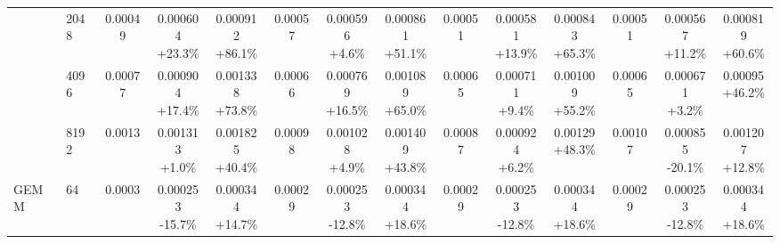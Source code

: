 \documentclass[acmlarge]{acmart}
\begin{document}
\begin{table}[htbp]
\begin{tabular}{llcccccccccccc}
 & 2048 & 0.00049 & \makecell{0.000604\\{\scriptsize +23.3\%}} & \makecell{0.000912\\{\scriptsize +86.1\%}} & 0.00057 & \makecell{0.000596\\{\scriptsize +4.6\%}} & \makecell{0.000861\\{\scriptsize +51.1\%}} & 0.00051 & \makecell{0.000581\\{\scriptsize +13.9\%}} & \makecell{0.000843\\{\scriptsize +65.3\%}} & 0.00051 & \makecell{0.000567\\{\scriptsize +11.2\%}} & \makecell{0.000819\\{\scriptsize +60.6\%}} \\
 & 4096 & 0.00077 & \makecell{0.000904\\{\scriptsize +17.4\%}} & \makecell{0.001338\\{\scriptsize +73.8\%}} & 0.00066 & \makecell{0.000769\\{\scriptsize +16.5\%}} & \makecell{0.001089\\{\scriptsize +65.0\%}} & 0.00065 & \makecell{0.000711\\{\scriptsize +9.4\%}} & \makecell{0.001009\\{\scriptsize +55.2\%}} & 0.00065 & \makecell{0.000671\\{\scriptsize +3.2\%}} & \makecell{0.00095\\{\scriptsize +46.2\%}} \\
 & 8192 & 0.0013 & \makecell{0.001313\\{\scriptsize +1.0\%}} & \makecell{0.001825\\{\scriptsize +40.4\%}} & 0.00098 & \makecell{0.001028\\{\scriptsize +4.9\%}} & \makecell{0.001409\\{\scriptsize +43.8\%}} & 0.00087 & \makecell{0.000924\\{\scriptsize +6.2\%}} & \makecell{0.00129\\{\scriptsize +48.3\%}} & 0.00107 & \makecell{0.000855\\{\scriptsize -20.1\%}} & \makecell{0.001207\\{\scriptsize +12.8\%}} \\
\midrule
\multirow{5}{*}{GEMM} & 64 & 0.0003 & \makecell{0.000253\\{\scriptsize -15.7\%}} & \makecell{0.000344\\{\scriptsize +14.7\%}} & 0.00029 & \makecell{0.000253\\{\scriptsize -12.8\%}} & \makecell{0.000344\\{\scriptsize +18.6\%}} & 0.00029 & \makecell{0.000253\\{\scriptsize -12.8\%}} & \makecell{0.000344\\{\scriptsize +18.6\%}} & 0.00029 & \makecell{0.000253\\{\scriptsize -12.8\%}} & \makecell{0.000344\\{\scriptsize +18.6\%}} \\

\end{tabular}
\end{table}
\end{document}
